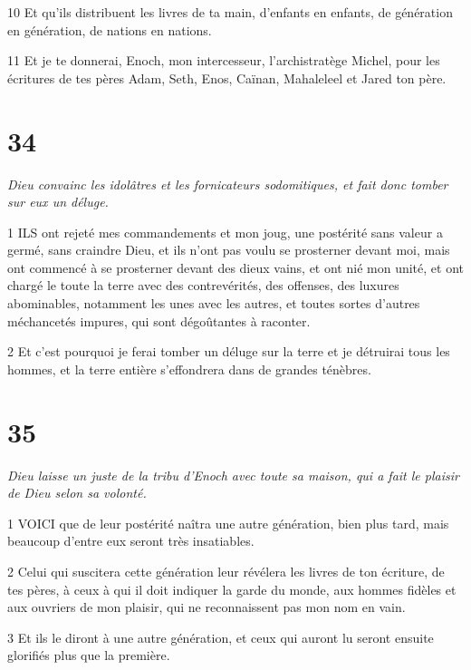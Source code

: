 \par 10 Et qu'ils distribuent les livres de ta main, d'enfants en enfants, de génération en génération, de nations en nations.

\par 11 Et je te donnerai, Enoch, mon intercesseur, l'archistratège Michel, pour les écritures de tes pères Adam, Seth, Enos, Caïnan, Mahaleleel et Jared ton père.

\chapter{34}

\par \textit{Dieu convainc les idolâtres et les fornicateurs sodomitiques, et fait donc tomber sur eux un déluge.}

\par 1 ILS ont rejeté mes commandements et mon joug, une postérité sans valeur a germé, sans craindre Dieu, et ils n'ont pas voulu se prosterner devant moi, mais ont commencé à se prosterner devant des dieux vains, et ont nié mon unité, et ont chargé le toute la terre avec des contrevérités, des offenses, des luxures abominables, notamment les unes avec les autres, et toutes sortes d'autres méchancetés impures, qui sont dégoûtantes à raconter.

\par 2 Et c'est pourquoi je ferai tomber un déluge sur la terre et je détruirai tous les hommes, et la terre entière s'effondrera dans de grandes ténèbres.

\chapter{35}

\par \textit{Dieu laisse un juste de la tribu d'Enoch avec toute sa maison, qui a fait le plaisir de Dieu selon sa volonté.}

\par 1 VOICI que de leur postérité naîtra une autre génération, bien plus tard, mais beaucoup d'entre eux seront très insatiables.

\par 2 Celui qui suscitera cette génération leur révélera les livres de ton écriture, de tes pères, à ceux à qui il doit indiquer la garde du monde, aux hommes fidèles et aux ouvriers de mon plaisir, qui ne reconnaissent pas mon nom en vain.

\par 3 Et ils le diront à une autre génération, et ceux qui auront lu seront ensuite glorifiés plus que la première.

